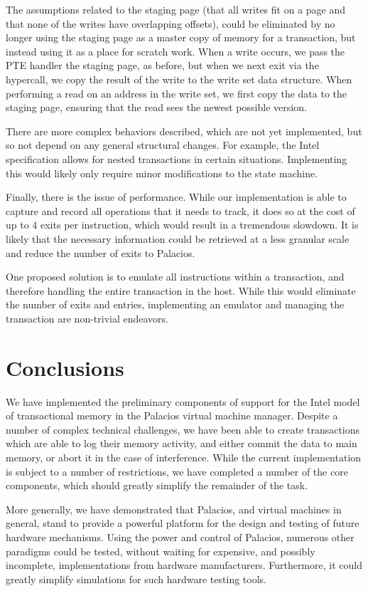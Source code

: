 \documentclass{acm_proc_article-sp}
\begin{document}
The assumptions related to the staging page (that all writes fit on a page
and that none of the writes have overlapping offsets), could be eliminated
by no longer using the staging page as a master copy of memory for a 
transaction, but instead using it as a place for scratch work. When a 
write occurs, we pass the PTE handler the staging page, as before, but when we 
next exit via the hypercall, we copy the result of the write to the write set
data structure. When performing a read on an address in the write set,
we first copy the data to the staging page, ensuring that the read sees the
newest possible version.

There are more complex behaviors described, which are not yet
implemented, but so not depend on any general structural changes. For example,
the Intel specification allows for nested transactions in certain situations.
Implementing this would likely only require minor modifications to the state
machine. 

Finally, there is the issue of performance. While our implementation is able 
to capture and record all operations that it needs to track, it does so at the
cost of up to $4$ exits per instruction, which would result in a tremendous
slowdown. It is likely that the necessary information could be retrieved at a 
less granular scale and reduce the number of exits to Palacios.

One proposed solution is to emulate all instructions within a transaction,
and therefore handling the entire transaction in the host. While this would
eliminate the number of exits and entries, implementing an emulator and managing
the transaction are non-trivial endeavors. 
  
\section{Conclusions}

We have implemented the preliminary components of support for the Intel model
of transactional memory in the Palacios virtual machine manager. Despite a 
number of complex technical challenges, we have been able to create
transactions which are able to log their memory activity, and either commit
the data to main memory, or abort it in the case of interference. While the
current implementation is subject to a number of restrictions, we have 
completed a number of the core components, which should greatly simplify 
the remainder of the task.

More generally, we have demonstrated that Palacios, and virtual machines in
general, stand to provide a powerful platform for the design and testing of
future hardware mechanisms. Using the power and control of Palacios, numerous
other paradigms could be tested, without waiting for expensive, and possibly
incomplete, implementations from hardware manufacturers. Furthermore, it could
greatly simplify simulations for such hardware testing tools. 
\end{document}
